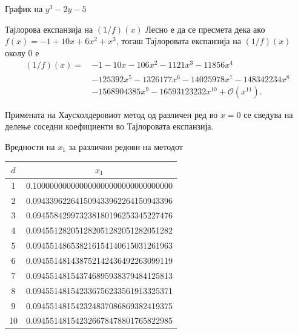 \documentclass[serif, xcolor={svgnames, table}, usepdftitle=false]{beamer}
\begin{document}
\begin{frame}{График на \(y^3 - 2 y - 5\)}
  \begin{figure}
    \centering
  \end{figure}
\end{frame}

\begin{frame}{Тајлорова експанзија на \((1 / {f})(x)\)}
  Лесно е да се пресмета дека ако \(f(x) = -1 + 10 x + 6 x^2 + x^3\), тогаш
  Тајлоровата експанзија на \((1 / {f})(x)\) околу \(0\) е
  \begin{equation*}
    \begin{aligned}
      (1 / {f})(x) = \, & {-}\num{1} - \num{10} x - \num{106} x^2 - \num{1121} x^3 - \num{11856} x^4 \\
      & {-} \num{125392} x^5 - \num{1326177} x^6 - \num{14025978} x^7 - \num{148342234} x^8 \\
      & {-}\num{1568904385} x^9 - \num{16593123232} x^{10} + \mathcal{O}(x^{11})\text{.}
    \end{aligned}
  \end{equation*}

  Примената на Хаусхолдеровиот метод од различен ред во \(x = 0\) се сведува на
  делење соседни коефициенти во Тајлоровата експанзија.
\end{frame}

\begin{frame}{Вредности на \(x_1\) за различни редови на методот}
  \begin{table}
    \centering
    \begin{tabular}{S[table-format=2.0] S[table-format=1.33]}
      \toprule
      {\(d\)} & {\(x_1\)} \\
       & 0.100000000000000000000000000000000 \\
      2 & 0.094339622641509433962264150943396 \\
      3 & 0.094558429973238180196253345227476 \\
      4 & 0.094551282051282051282051282051282 \\
      5 & 0.094551486538216154140615031261963 \\
      6 & 0.094551481438752142436492263099119 \\
      7 & 0.094551481543746895938379484125813 \\
      8 & 0.094551481542336756233561913325371 \\
      9 & 0.094551481542324837086869382419375 \\
      10 & 0.094551481542326678478801765822985 \\
      \bottomrule
    \end{tabular}
  \end{table}
\end{frame}
\end{document}
